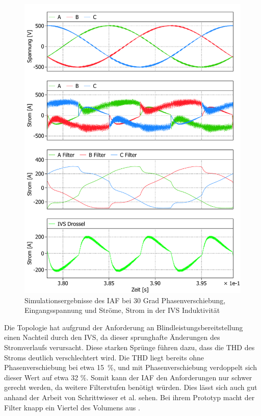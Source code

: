 \begin{figure}
	\centering
	\includegraphics[width=1\linewidth]{content/Grafiken/IAF_AC+L_30Grad}
	\caption{Simulationsergebnisse des IAF bei 30 Grad Phasenverschiebung, Eingangsspannung und Ströme, Strom in der IVS Induktivität }
	\label{fig:iafacl30grad}
\end{figure}
Die Topologie hat aufgrund der Anforderung an Blindleistungsbereitstellung einen Nachteil durch den IVS, da dieser sprunghafte Änderungen des Stromverlaufs verursacht. Diese starken Sprünge führen dazu, dass die THD des Stroms deutlich verschlechtert wird. Die THD liegt bereits ohne Phasenverschiebung bei etwa 15~\%, und mit Phasenverschiebung verdoppelt sich dieser Wert auf etwa 32 \%.  Somit kann der IAF den Anforderungen nur schwer gerecht werden, da weitere Filterstufen benötigt würden. Dies lässt sich auch gut anhand der Arbeit von Schrittwieser et al. sehen. Bei ihrem Prototyp macht der Filter knapp ein Viertel des Volumens aus \cite{IAF99}.


